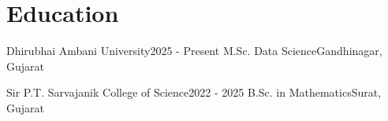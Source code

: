 \section{Education}
    \resumeSubHeadingListStart

    \resumeSubheading
    {Dhirubhai Ambani University}{2025 - Present}
    {M.Sc. Data Science}{Gandhinagar, Gujarat}

    \resumeSubheading
    {Sir P.T. Sarvajanik College of Science}{2022 - 2025}
    {B.Sc. in Mathematics}{Surat, Gujarat}

    \resumeSubHeadingListEnd
